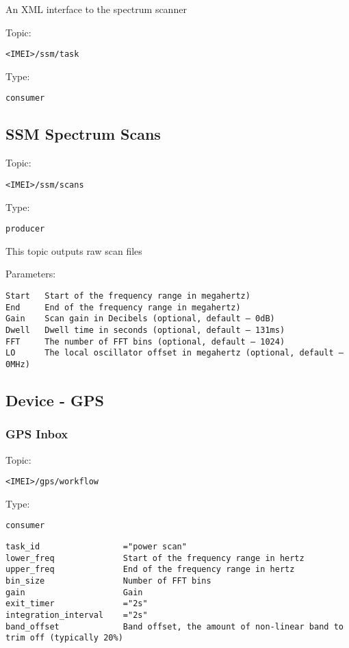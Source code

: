 An XML interface to the spectrum scanner
    
Topic:
\begin{lstlisting}<IMEI>/ssm/task\end{lstlisting}
Type:
\begin{lstlisting}consumer\end{lstlisting}

\subsection{SSM Spectrum Scans}

Topic:
\begin{lstlisting}<IMEI>/ssm/scans\end{lstlisting}
Type:
\begin{lstlisting}producer\end{lstlisting}
    
This topic outputs raw scan files

Parameters:
\begin{lstlisting}
Start   Start of the frequency range in megahertz)
End     End of the frequency range in megahertz)
Gain    Scan gain in Decibels (optional, default – 0dB)
Dwell   Dwell time in seconds (optional, default – 131ms)
FFT     The number of FFT bins (optional, default – 1024)
LO      The local oscillator offset in megahertz (optional, default – 0MHz)
\end{lstlisting}


\subsection{Device - GPS}
\subsubsection{GPS Inbox}

Topic:
\begin{lstlisting}<IMEI>/gps/workflow\end{lstlisting}
Type:
\begin{lstlisting}consumer\end{lstlisting}


\begin{lstlisting}
task_id                 ="power scan"
lower_freq              Start of the frequency range in hertz
upper_freq              End of the frequency range in hertz
bin_size                Number of FFT bins
gain                    Gain
exit_timer              ="2s"
integration_interval    ="2s"
band_offset             Band offset, the amount of non-linear band to trim off (typically 20%)
\end{lstlisting}

